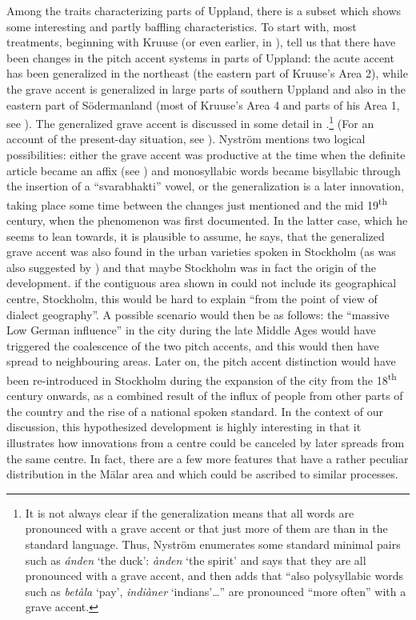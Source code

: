 Among the traits characterizing parts of Uppland, there is a subset which shows some interesting and partly baffling characteristics. To start with, most treatments, beginning with Kruuse (or even earlier, in \citet{Rydqvist1868}), tell us that there have been changes in the pitch accent systems in parts of Uppland: the acute accent has been generalized in the northeast (the eastern part of Kruuse’s Area 2), while the grave accent is generalized in large parts of southern Uppland and also in the eastern part of Södermanland (most of Kruuse’s Area 4 and parts of his Area 1, see ). The generalized grave accent is discussed in some detail in \citet{Nyström1997}.\footnote{ It is not always clear if the generalization means that all words are pronounced with a grave accent or that just more of them are than in the standard language. Thus, Nyström enumerates some standard minimal pairs such as \textit{ánden} ‘the duck’: \textit{ànden} ‘the spirit’ and says that they are all pronounced with a grave accent, and then adds that “also polysyllabic words such as \textit{betàla} ‘pay’, \textit{indiàner} ‘indians’…” are pronounced “more often” with a grave accent. } (For an account of the present-day situation, see \citet{Ericsson2006}). Nyström mentions two logical possibilities: either the grave accent was productive at the time when the definite article became an affix (see ) and monosyllabic words became bisyllabic through the insertion of a “svarabhakti” vowel, or the generalization is a later innovation, taking place some time between the changes just mentioned and the mid 19\textsuperscript{th} century, when the phenomenon was first documented. In the latter case, which he seems to lean towards, it is plausible to assume, he says, that the generalized grave accent was also found in the urban varieties spoken in Stockholm (as was also suggested by \citet{Otterbjörk1982}) and that maybe Stockholm was in fact the origin of the development. if the contiguous area shown in  could not include its geographical centre, Stockholm, this would be hard to explain “from the point of view of dialect geography”. A possible scenario would then be as follows: the “massive Low German influence” in the city during the late Middle Ages would have triggered the coalescence of the two pitch accents, and this would then have spread to neighbouring areas. Later on, the pitch accent distinction would have been re-introduced in Stockholm during the expansion of the city from the 18\textsuperscript{th} century onwards, as a combined result of the influx of people from other parts of the country and the rise of a national spoken standard. In the context of our discussion, this hypothesized development is highly interesting in that it illustrates how innovations from a centre could be canceled by later spreads from the same centre. In fact, there are a few more features that have a rather peculiar distribution in the Mälar area and which could be ascribed to similar processes. 

